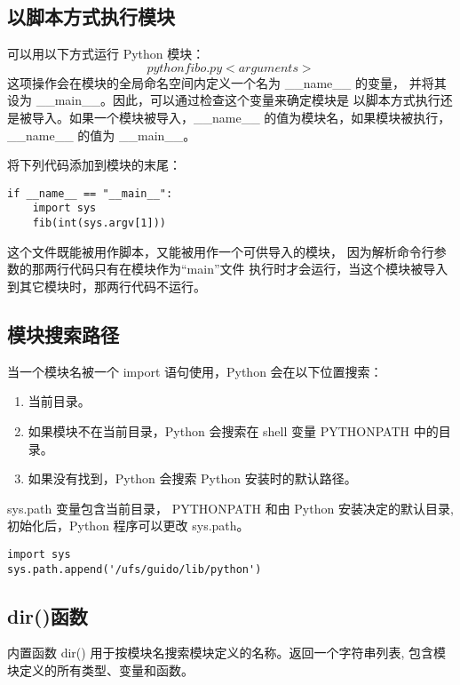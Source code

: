 \documentclass[a4paper, 12pt]{article}
\begin{document}
\subsection{以脚本方式执行模块}
可以用以下方式运行 Python 模块：
\[
python fibo.py <arguments>
\]
这项操作会在模块的全局命名空间内定义一个名为 \_\_name\_\_ 的变量，
并将其设为 \_\_main\_\_。因此，可以通过检查这个变量来确定模块是
以脚本方式执行还是被导入。如果一个模块被导入，\_\_name\_\_ 的值为模块名，如果模块被执行，
\_\_name\_\_ 的值为 \_\_main\_\_。\par
将下列代码添加到模块的末尾：\par
\begin{listing}[h!]
\begin{verbatim}
if __name__ == "__main__":
    import sys
    fib(int(sys.argv[1]))
\end{verbatim}
\end{listing}
这个文件既能被用作脚本，又能被用作一个可供导入的模块，
因为解析命令行参数的那两行代码只有在模块作为“main”文件
执行时才会运行，当这个模块被导入到其它模块时，那两行代码不运行。\par

\subsection{模块搜索路径}
当一个模块名被一个 import 语句使用，Python 会在以下位置搜索：
\begin{enumerate}
    \item 当前目录。
    \item 如果模块不在当前目录，Python 会搜索在 shell 变量 PYTHONPATH 中的目录。
    \item 如果没有找到，Python 会搜索 Python 安装时的默认路径。
\end{enumerate}
sys.path 变量包含当前目录， PYTHONPATH 和由 Python 安装决定的默认目录,
初始化后，Python 程序可以更改 sys.path。\par
\begin{listing}[h!]
\begin{verbatim}
import sys
sys.path.append('/ufs/guido/lib/python')
\end{verbatim}
\end{listing}

\subsection{dir()函数}
内置函数 dir() 用于按模块名搜索模块定义的名称。返回一个字符串列表,
包含模块定义的所有类型、变量和函数。\par
\end{document}
